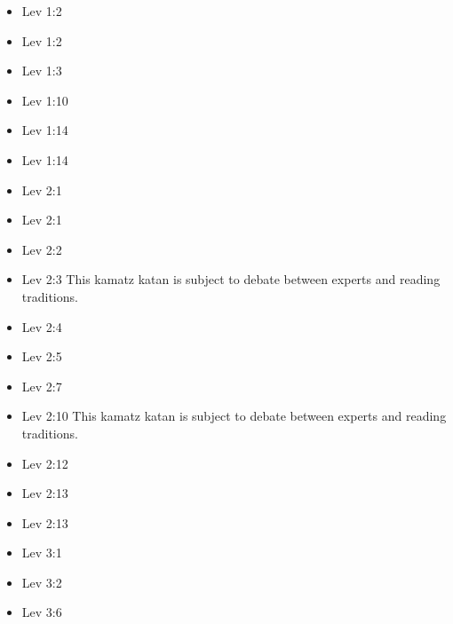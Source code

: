 \documentclass[14pt]{book}
\begin{document}
\begin{multicols}{2}\begin{itemize}
\item Lev 1:2

\item Lev 1:2

\item Lev 1:3

\item Lev 1:10

\item Lev 1:14

\item Lev 1:14

\item Lev 2:1

\item Lev 2:1

\item Lev 2:2

\item Lev 2:3 This kamatz katan is subject to debate between experts and reading traditions.

\item Lev 2:4

\item Lev 2:5

\item Lev 2:7

\item Lev 2:10 This kamatz katan is subject to debate between experts and reading traditions.

\item Lev 2:12

\item Lev 2:13

\item Lev 2:13

\item Lev 3:1

\item Lev 3:2

\item Lev 3:6


\end{itemize}
\end{multicols}
\end{document}
